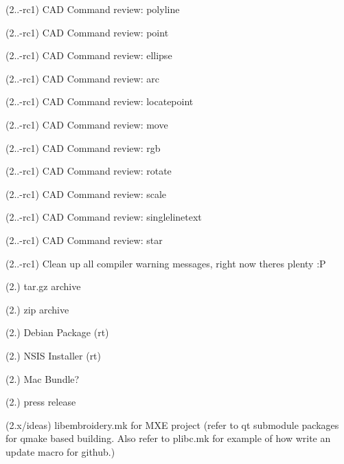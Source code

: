 \begin{DoxyRefList}
\label{todo__todo000051}%
%
(2..-\/rc1) CAD Command review\+: polyline

\label{todo__todo000052}%
%
(2..-\/rc1) CAD Command review\+: point

\label{todo__todo000053}%
%
(2..-\/rc1) CAD Command review\+: ellipse

\label{todo__todo000054}%
%
(2..-\/rc1) CAD Command review\+: arc

\label{todo__todo000056}%
%
(2..-\/rc1) CAD Command review\+: locatepoint

\label{todo__todo000057}%
%
(2..-\/rc1) CAD Command review\+: move

\label{todo__todo000058}%
%
(2..-\/rc1) CAD Command review\+: rgb

\label{todo__todo000059}%
%
(2..-\/rc1) CAD Command review\+: rotate

\label{todo__todo000060}%
%
(2..-\/rc1) CAD Command review\+: scale

\label{todo__todo000061}%
%
(2..-\/rc1) CAD Command review\+: singlelinetext

\label{todo__todo000062}%
%
(2..-\/rc1) CAD Command review\+: star

\label{todo__todo000063}%
%
(2..-\/rc1) Clean up all compiler warning messages, right now theres plenty \+:P

\label{todo__todo000064}%
%
(2.) tar.\+gz archive

\label{todo__todo000065}%
%
(2.) zip archive

\label{todo__todo000066}%
%
(2.) Debian Package (rt)

\label{todo__todo000067}%
%
(2.) NSIS Installer (rt)

\label{todo__todo000068}%
%
(2.) Mac Bundle?

\label{todo__todo000069}%
%
(2.) press release

\label{todo__todo000070}%
%
(2.\+x/ideas) libembroidery.\+mk for MXE project (refer to qt submodule packages for qmake based building. Also refer to plibc.\+mk for example of how write an update macro for github.)


\end{DoxyRefList}
